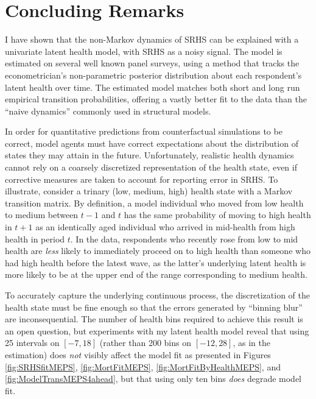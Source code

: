 \documentclass[12pt,pdftex,letterpaper]{article}
\begin{document}
\section{Concluding Remarks}\label{sec:Conclusion}

I have shown that the non-Markov dynamics of SRHS can be explained with a univariate latent health model, with SRHS as a noisy signal.  The model is estimated on several well known panel surveys, using a method that tracks the econometrician's non-parametric posterior distribution about each respondent's latent health over time.  The estimated model matches both short and long run empirical transition probabilities, offering a vastly better fit to the data than the ``naive dynamics'' commonly used in structural models.

In order for quantitative predictions from counterfactual simulations to be correct, model agents must have correct expectations about the distribution of states they may attain in the future.  Unfortunately, realistic health dynamics cannot rely on a coarsely discretized representation of the health state, even if corrective measures are taken to account for reporting error in SRHS.  To illustrate, consider a trinary (low, medium, high) health state with a Markov transition matrix.  By definition, a model individual who moved from low health to medium between $t-1$ and $t$ has the same probability of moving to high health in $t+1$ as an identically aged individual who arrived in mid-health from high health in period $t$.  In the data, respondents who recently rose from low to mid health are \textit{less} likely to immediately proceed on to high health than someone who had high health before the latest wave, as the latter's underlying latent health is more likely to be at the upper end of the range corresponding to medium health.

To accurately capture the underlying continuous process, the discretization of the health state must be fine enough so that the errors generated by ``binning blur'' are inconsequential.  The number of health bins required to achieve this result is an open question, but experiments with my latent health model reveal that using 25 intervals on $[-7,18]$ (rather than 200 bins on $[-12,28]$, as in the estimation) does \textit{not} visibly affect the model fit as presented in Figures \ref{fig:SRHSfitMEPS}, \ref{fig:MortFitMEPS}, \ref{fig:MortFitByHealthMEPS}, and \ref{fig:ModelTransMEPS4ahead}, but that using only ten bins \textit{does} degrade model fit.
\end{document}
